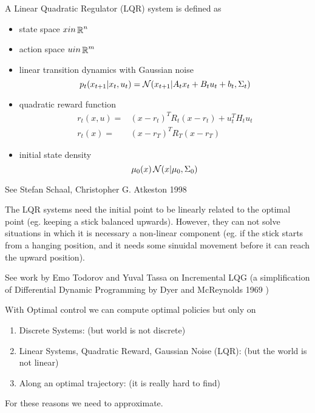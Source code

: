 A Linear Quadratic Regulator (LQR) system is defined as

\begin{itemize}
  \item state space $x in \operatorname*{\mathbb{\mathop{R}}}^n$
  \item action space $u in \operatorname*{\mathbb{\mathop{R}}}^m$
  \item linear transition dynamics with Gaussian noise
    \begin{equation}
      p_t(x_{t+1}|x_t, u_t) = \operatorname*{\mathcal{N}}(x_{t+1}|A_t x_t + B_t u_t + b_t, \Sigma_t)
    \end{equation}
  \item quadratic reward function
    \begin{align}
      r_t(x,u) =& (x-r_t)^T R_t(x-r_t) + u_t^T H_t u_t \\
      r_t(x) =& (x-r_T)^T R_T(x-r_T)
    \end{align}
  \item initial state density
    \begin{equation}
      \mu_0(x) \operatorname*{\mathcal{N}}(x|\mu_0, \Sigma_0)
    \end{equation}
\end{itemize}

See Stefan Schaal, Christopher G. Atkeston 1998 \cite{schaal1998constructive}

The LQR systems need the initial point to be linearly related to the optimal
point (eg. keeping a stick balanced upwards). However, they can not solve
situations in which it is necessary a non-linear component (eg. if the stick
  starts from a hanging position, and it needs some sinuidal movement before it
can reach the upward position).

See work by Emo Todorov and Yuval Tassa on Incremental LQG (a simplification of
  Differential Dynamic Programming by Dyer and McReynolds 1969
\cite{dyer1969optimization})

With Optimal control we can compute optimal policies but only on

\begin{enumerate}
  \item Discrete Systems: (but world is not discrete)
  \item Linear Systems, Quadratic Reward, Gaussian Noise (LQR): (but the world
    is not linear)
  \item Along an optimal trajectory: (it is really hard to find)
\end{enumerate}

For these reasons we need to approximate.

